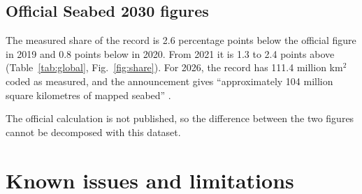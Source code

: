 \documentclass[essd, manuscript]{copernicus}
\renewcommand{\_}{\usorig\allowbreak}
\begin{document}
\subsection{Official Seabed 2030 figures}

The measured share of the record is 2.6 percentage points below the official figure in 2019 and 0.8 points below in 2020.
From 2021 it is 1.3 to 2.4 points above (Table~\ref{tab:global}, Fig.~\ref{fig:share}).
For 2026, the record has 111.4 million km$^2$ coded as measured, and the announcement gives ``approximately 104 million square kilometres of mapped seabed'' \citep{news2026}.

The official calculation is not published, so the difference between the two figures cannot be decomposed with this dataset.

\section{Known issues and limitations}
\label{sec:limits}
\end{document}
